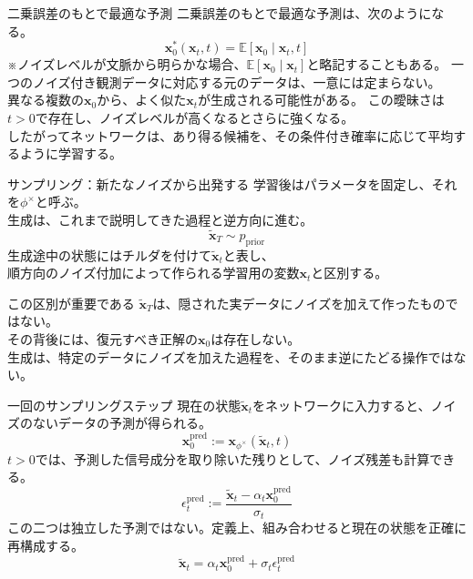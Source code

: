 \begin{frame}{二乗誤差のもとで最適な予測}
    二乗誤差のもとで最適な予測は、次のようになる。
    \[
        \boldsymbol{x}_{0}^{*}(\boldsymbol{x}_{t},t)=\mathbb{E}[\boldsymbol{x}_{0}\mid\boldsymbol{x}_{t},t]
    \]
    \small ※ノイズレベルが文脈から明らかな場合、\(\mathbb{E}[\boldsymbol{x}_{0}\mid\boldsymbol{x}_{t}]\)と略記することもある。
    \vspace{0.5em}
    一つのノイズ付き観測データに対応する元のデータは、一意には定まらない。\\
    異なる複数の\(\boldsymbol{x}_{0}\)から、よく似た\(\boldsymbol{x}_{t}\)が生成される可能性がある。
    \vspace{0.4em}
    この曖昧さは\(t>0\)で存在し、ノイズレベルが高くなるとさらに強くなる。\\
    したがってネットワークは、あり得る候補を、その条件付き確率に応じて平均するように学習する。
\end{frame}
\begin{frame}{サンプリング：新たなノイズから出発する}
    学習後はパラメータを固定し、それを\(\phi^{\times}\)と呼ぶ。\\
    生成は、これまで説明してきた過程と逆方向に進む。
    \[
        \tilde{\boldsymbol{x}}_{T}\sim p_{\mathrm{prior}}
    \]
    生成途中の状態にはチルダを付けて\(\tilde{\boldsymbol{x}}_{t}\)と表し、\\
    順方向のノイズ付加によって作られる学習用の変数\(\boldsymbol{x}_{t}\)と区別する。
    \vspace{0.6em}
    \begin{alertblock}{この区別が重要である}
        \(\tilde{\boldsymbol{x}}_{T}\)は、隠された実データにノイズを加えて作ったものではない。\\
        その背後には、復元すべき正解の\(\boldsymbol{x}_{0}\)は存在しない。\\
        生成は、特定のデータにノイズを加えた過程を、そのまま逆にたどる操作ではない。
    \end{alertblock}
\end{frame}
\begin{frame}{一回のサンプリングステップ}
    現在の状態\(\tilde{\boldsymbol{x}}_{t}\)をネットワークに入力すると、ノイズのないデータの予測が得られる。
    \[
        \boldsymbol{x}_{0}^{\mathrm{pred}}:=\boldsymbol{x}_{\phi^{\times}}(\tilde{\boldsymbol{x}}_{t},t)
    \]
    \(t>0\)では、予測した信号成分を取り除いた残りとして、ノイズ残差も計算できる。
    \[
        \epsilon_{t}^{\mathrm{pred}}:=\frac{\tilde{\boldsymbol{x}}_{t}-\alpha_{t}\boldsymbol{x}_{0}^{\mathrm{pred}}}{\sigma_{t}}
    \]
    この二つは独立した予測ではない。定義上、組み合わせると現在の状態を正確に再構成する。
    \[
        \tilde{\boldsymbol{x}}_{t}=\alpha_{t}\boldsymbol{x}_{0}^{\mathrm{pred}}+\sigma_{t}\epsilon_{t}^{\mathrm{pred}}
    \]
\end{frame}
